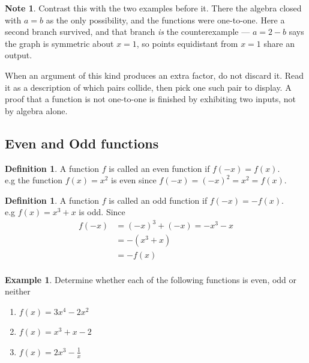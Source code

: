 \documentclass[11pt,a4paper]{article}
\theoremstyle{definition}
\newtheorem{definition}[thm]{Definition}
\newtheorem{example}[thm]{Example}
\newtheorem{note}[thm]{Note}
\begin{document}
\begin{note}
Contrast this with the two examples before it. There the algebra closed with
$a=b$ as the only possibility, and the functions were one-to-one. Here a second
branch survived, and that branch \emph{is} the counterexample --- $a=2-b$ says the
graph is symmetric about $x=1$, so points equidistant from $x=1$ share an output.

When an argument of this kind produces an extra factor, do not discard it. Read it
as a description of which pairs collide, then pick one such pair to display. A
proof that a function is not one-to-one is finished by exhibiting two inputs, not
by algebra alone.
\end{note}

\subsection{Even and Odd functions}
\begin{definition}

A function $f$ is called an even function if $f(-x)=f(x)$.\\

e.g the function $f(x)=x^2$ is even since $f(-x)=(-x)^2=x^2=f(x)$.
\end{definition}
\begin{definition}

A function $f$ is called an odd function if $f(-x)=-f(x)$.\\

e.g $f(x)=x^3+x$ is odd. Since 
\begin{align*}
f(-x) & = (-x)^3+(-x)=-x^3-x\\
      & = -(x^3+x)\\
      & = -f(x)\\
\end{align*}
\end{definition}
\begin{example}

Determine whether each of the following functions is even, odd or neither
\begin{enumerate}
\item $f(x)=3x^4-2x^2$
\item $f(x)=x^3+x-2$
\item $f(x)=2x^3-\frac{1}{x}$\\
\end{enumerate}
\end{example}
\end{document}
